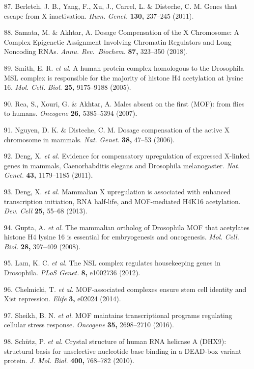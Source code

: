 \documentclass[11pt,twoside]{MPIthesis}
\theoremstyle{definition}
\theoremstyle{definition}
\theoremstyle{definition}
\theoremstyle{remark}
\begin{document}
87. Berletch, J. B., Yang, F., Xu, J., Carrel, L. \& Disteche, C. M.
Genes that escape from X inactivation. \emph{Hum. Genet.} \textbf{130,}
237--245 (2011).

88. Samata, M. \& Akhtar, A. Dosage Compensation of the X Chromosome: A
Complex Epigenetic Assignment Involving Chromatin Regulators and Long
Noncoding RNAs. \emph{Annu. Rev.~Biochem.} \textbf{87,} 323--350 (2018).

89. Smith, E. R. \emph{et al.} A human protein complex homologous to the
Drosophila MSL complex is responsible for the majority of histone H4
acetylation at lysine 16. \emph{Mol. Cell. Biol.} \textbf{25,}
9175--9188 (2005).

90. Rea, S., Xouri, G. \& Akhtar, A. Males absent on the first (MOF):
from flies to humans. \emph{Oncogene} \textbf{26,} 5385--5394 (2007).

91. Nguyen, D. K. \& Disteche, C. M. Dosage compensation of the active X
chromosome in mammals. \emph{Nat. Genet.} \textbf{38,} 47--53 (2006).

92. Deng, X. \emph{et al.} Evidence for compensatory upregulation of
expressed X-linked genes in mammals, Caenorhabditis elegans and
Drosophila melanogaster. \emph{Nat. Genet.} \textbf{43,} 1179--1185
(2011).

93. Deng, X. \emph{et al.} Mammalian X upregulation is associated with
enhanced transcription initiation, RNA half-life, and MOF-mediated H4K16
acetylation. \emph{Dev. Cell} \textbf{25,} 55--68 (2013).

94. Gupta, A. \emph{et al.} The mammalian ortholog of Drosophila MOF
that acetylates histone H4 lysine 16 is essential for embryogenesis and
oncogenesis. \emph{Mol. Cell. Biol.} \textbf{28,} 397--409 (2008).

95. Lam, K. C. \emph{et al.} The NSL complex regulates housekeeping
genes in Drosophila. \emph{PLoS Genet.} \textbf{8,} e1002736 (2012).

96. Chelmicki, T. \emph{et al.} MOF-associated complexes ensure stem
cell identity and Xist repression. \emph{Elife} \textbf{3,} e02024
(2014).

97. Sheikh, B. N. \emph{et al.} MOF maintains transcriptional programs
regulating cellular stress response. \emph{Oncogene} \textbf{35,}
2698--2710 (2016).

98. Schütz, P. \emph{et al.} Crystal structure of human RNA helicase A
(DHX9): structural basis for unselective nucleotide base binding in a
DEAD-box variant protein. \emph{J. Mol. Biol.} \textbf{400,} 768--782
(2010).
\end{document}
